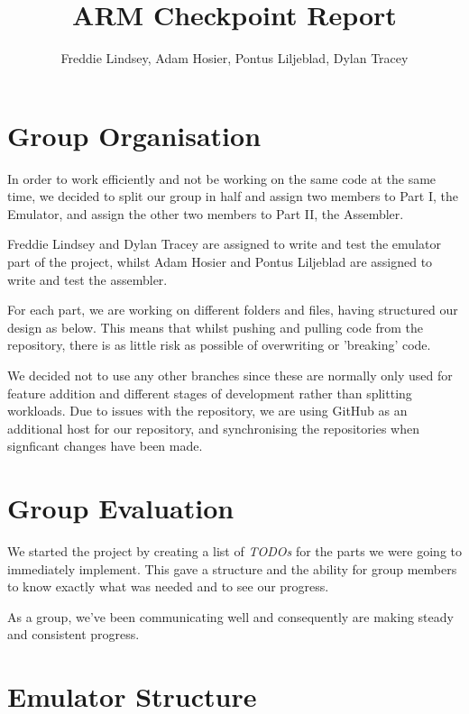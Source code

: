 \documentclass[11pt]{article}
\begin{document}
\title{ARM Checkpoint Report}
\author{Freddie Lindsey, Adam Hosier, Pontus Liljeblad, Dylan Tracey}

\maketitle

\section{Group Organisation}

In order to work efficiently and not be working on the same code at the same time, we decided to split our group in half and assign two members to Part I, the Emulator, and assign the other two members to Part II, the Assembler.

Freddie Lindsey and Dylan Tracey are assigned to write and test the emulator part of the project, whilst Adam Hosier and Pontus Liljeblad are assigned to write and test the assembler.

For each part, we are working on different folders and files, having structured our design as below. This means that whilst pushing and pulling code from the repository, there is as little risk as possible of overwriting or 'breaking' code.

We decided not to use any other branches since these are normally only used for feature addition and different stages of development rather than splitting workloads. Due to issues with the repository, we are using GitHub as an additional host for our repository, and synchronising the repositories when signficant changes have been made.

\section{Group Evaluation}

We started the project by creating a list of \textit{TODOs} for the parts we were going to immediately implement. This gave a structure and the ability for group members to know exactly what was needed and to see our progress.

As a group, we've been communicating well and consequently are making steady and consistent progress.

\section{Emulator Structure}
\end{document}

